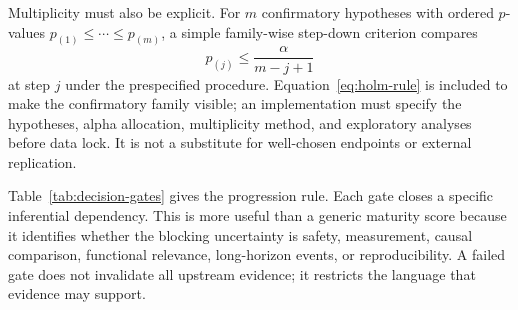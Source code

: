 \documentclass[10pt,conference]{IEEEtran}
\begin{document}
Multiplicity must also be explicit. For $m$ confirmatory hypotheses with ordered $p$-values $p_{(1)}\leq\cdots\leq p_{(m)}$, a simple family-wise step-down criterion compares
\begin{equation}
p_{(j)}\leq \frac{\alpha}{m-j+1}
\label{eq:holm-rule}
\end{equation}
at step $j$ under the prespecified procedure. Equation~\eqref{eq:holm-rule} is included to make the confirmatory family visible; an implementation must specify the hypotheses, alpha allocation, multiplicity method, and exploratory analyses before data lock. It is not a substitute for well-chosen endpoints or external replication.

Table~\ref{tab:decision-gates} gives the progression rule. Each gate closes a specific inferential dependency. This is more useful than a generic maturity score because it identifies whether the blocking uncertainty is safety, measurement, causal comparison, functional relevance, long-horizon events, or reproducibility. A failed gate does not invalidate all upstream evidence; it restricts the language that evidence may support.
\end{document}
